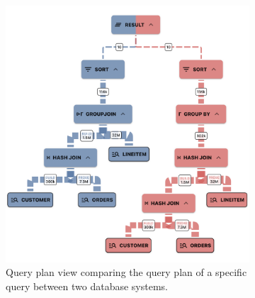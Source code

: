 \begin{figure}[h]
  \centering
  \begin{subfigure}[b]{0.5\linewidth}
    \includegraphics[width=\linewidth]{figures/query-plan-slim.png}
    \caption{Query plan view comparing the query plan of a specific query between two database systems.}
      \label{fig:query-plan-basic}
  \end{subfigure}
  \hspace{1cm} %
  \begin{subfigure}[b]{0.35\linewidth}

\end{subfigure}
\end{figure}
